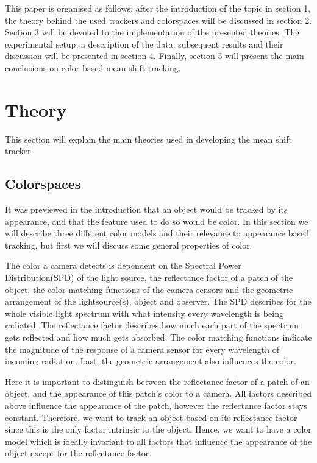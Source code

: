 \documentclass[a4paper,11pt]{article}
\begin{document}
	This paper is organised as follows:  after the introduction of the topic in section 1, the theory behind the used trackers and colorspaces will be discussed in section 2.
	Section 3 will be devoted to the implementation of the presented theories. The experimental setup, a description of the data, subsequent results and their discussion will be presented in section 4. 
	Finally, section 5 will present the main conclusions on color based mean shift tracking.

\section{Theory}	
	This section will explain the main theories used in developing the mean shift tracker. 
	\subsection{Colorspaces}
		It was previewed in the introduction that an object would be tracked by its appearance, and that the feature used to do so would be color. In this section we will describe three different color models and their relevance to appearance based tracking, but first we will discuss some general properties of color.

The color a camera detects is dependent on the Spectral Power Distribution(SPD) of the light source, the reflectance factor of a patch of the object, the color matching functions of the camera sensors and the geometric arrangement of the lightsource(s), object and observer. The SPD describes for the whole visible light spectrum with what intensity every wavelength is being radiated. The reflectance factor  describes how much each part of the spectrum gets reflected and how much gets absorbed. The color matching functions indicate the magnitude of the response of a camera sensor for every wavelength of incoming radiation. Last, the geometric arrangement also influences the color.

Here it is important to distinguish between the reflectance factor of a patch of an object, and the appearance of this patch's color to a camera. All factors described above influence the appearance of the patch, however the reflectance factor stays constant. Therefore, we want to track an object based on its reflectance factor since this is the only factor intrinsic to the object.  Hence, we want to have a color model which is ideally invariant to all factors that influence the appearance of the object except for the reflectance factor.  
\end{document}
